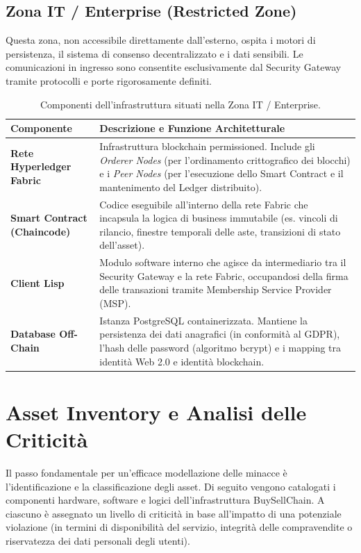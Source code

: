 \documentclass[12pt,a4paper]{article}
\begin{document}
\newpage

\subsection{Zona IT / Enterprise (Restricted Zone)}
Questa zona, non accessibile direttamente dall'esterno, ospita i motori di persistenza, il sistema di consenso decentralizzato e i dati sensibili. Le comunicazioni in ingresso sono consentite esclusivamente dal Security Gateway tramite protocolli e porte rigorosamente definiti.

\begin{table}[h]
\centering
\small
\renewcommand{\arraystretch}{1.4}
\begin{tabularx}{\textwidth}{>{\hsize=0.3\hsize\bfseries}X >{\hsize=0.7\hsize}X}
\toprule
Componente & Descrizione e Funzione Architetturale \\
\midrule
Rete Hyperledger Fabric & Infrastruttura blockchain permissioned. Include gli \textit{Orderer Nodes} (per l'ordinamento crittografico dei blocchi) e i \textit{Peer Nodes} (per l'esecuzione dello Smart Contract e il mantenimento del Ledger distribuito). \\
Smart Contract (Chaincode) & Codice eseguibile all'interno della rete Fabric che incapsula la logica di business immutabile (es. vincoli di rilancio, finestre temporali delle aste, transizioni di stato dell'asset). \\
Client Lisp & Modulo software interno che agisce da intermediario tra il Security Gateway e la rete Fabric, occupandosi della firma delle transazioni tramite Membership Service Provider (MSP). \\
Database Off-Chain & Istanza PostgreSQL containerizzata. Mantiene la persistenza dei dati anagrafici (in conformità al GDPR), l'hash delle password (algoritmo bcrypt) e i mapping tra identità Web 2.0 e identità blockchain. \\
\bottomrule
\end{tabularx}
\caption{Componenti dell'infrastruttura situati nella Zona IT / Enterprise.}
\end{table}

\newpage

\section{Asset Inventory e Analisi delle Criticità}
Il passo fondamentale per un'efficace modellazione delle minacce è l'identificazione e la classificazione degli asset. Di seguito vengono catalogati i componenti hardware, software e logici dell'infrastruttura BuySellChain. A ciascuno è assegnato un livello di criticità in base all'impatto di una potenziale violazione (in termini di disponibilità del servizio, integrità delle compravendite o riservatezza dei dati personali degli utenti).
\end{document}
